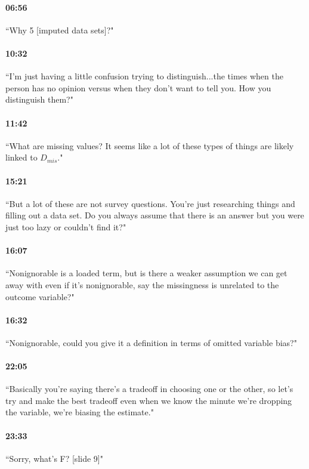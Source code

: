 \documentclass[11pt]{article}
\begin{document}
\paragraph{06:56} ``Why 5 [imputed data sets]?"

\paragraph{10:32} ``I'm just having a little confusion trying to distinguish...the times when the person has no opinion versus when they don't want to tell you. How you distinguish them?"

\paragraph{11:42} ``What are missing values? It seems like a lot of these types of things are likely linked to $D_{mis}$."

\paragraph{15:21} ``But a lot of these are not survey questions. You're just researching things and filling out a data set. Do you always assume that there is an answer but you were just too lazy or couldn't find it?"

\paragraph{16:07} ``Nonignorable is a loaded term, but is there a weaker assumption we can get away with even if it's nonignorable, say the missingness is unrelated to the outcome variable?"

\paragraph{16:32} ``Nonignorable, could you give it a definition in terms of omitted variable bias?"

\paragraph{22:05} ``Basically you're saying there's a tradeoff in choosing one or the other, so let's try and make the best tradeoff even when we know the minute we're dropping the variable, we're biasing the estimate."

\paragraph{23:33} ``Sorry, what's F? [slide 9]"
\end{document}
